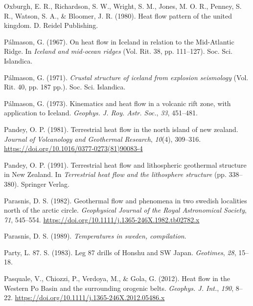 \begin{CSLReferences}{1}{1}
\leavevmode{}%
Oxburgh, E. R., Richardson, S. W., Wright, S. M., Jones, M. O. R., Penney, S. R., Watson, S. A., \& Bloomer, J. R. (1980). Heat flow pattern of the united kingdom. D. Reidel Publishing.

\leavevmode{}%
Pálmason, G. (1967). On heat flow in {Iceland} in relation to the {Mid-Atlantic Ridge}. In \emph{Iceland and mid-ocean ridges} (Vol. Rit. 38, pp. 111--127). Soc. Sci. Islandica.

\leavevmode{}%
Pálmason, G. (1971). \emph{Crustal structure of iceland from explosion seismology} (Vol. Rit. 40, pp. 187 pp.). Soc. Sci. Islandica.

\leavevmode{}%
Pálmason, G. (1973). Kinematics and heat flow in a volcanic rift zone, with application to {Iceland}. \emph{Geophys. J. Roy. Astr. Soc.}, \emph{33}, 451--481.

\leavevmode{}%
Pandey, O. P. (1981). Terrestrial heat flow in the north island of new zealand. \emph{Journal of Volcanology and Geothermal Research}, \emph{10}(4), 309--316. \url{https://doi.org/10.1016/0377-0273(81)90083-4}

\leavevmode{}%
Pandey, O. P. (1991). Terrestrial heat flow and lithospheric geothermal structure in {New Zealand}. In \emph{Terrestrial heat flow and the lithosphere structure} (pp. 338--380). Springer Verlag.

\leavevmode{}%
Parasnis, D. S. (1982). Geothermal flow and phenomena in two swedish localities north of the arctic circle. \emph{Geophysical Journal of the Royal Astronomical Society}, \emph{71}, 545--554. \url{https://doi.org/10.1111/j.1365-246X.1982.tb02782.x}

\leavevmode{}%
Parasnis, D. S. (1989). \emph{Temperatures in sweden, compilation}.

\leavevmode{}%
Party, L. 87. S. (1983). Leg 87 drills of {Honshu and SW Japan}. \emph{Geotimes}, \emph{28}, 15--18.

\leavevmode{}%
Pasquale, V., Chiozzi, P., Verdoya, M., \& Gola, G. (2012). Heat flow in the {Western Po Basin} and the surrounding orogenic belts. \emph{Geophys. J. Int.}, \emph{190}, 8--22. \url{https://doi.org/10.1111/j.1365-246X.2012.05486.x}


\end{CSLReferences}
